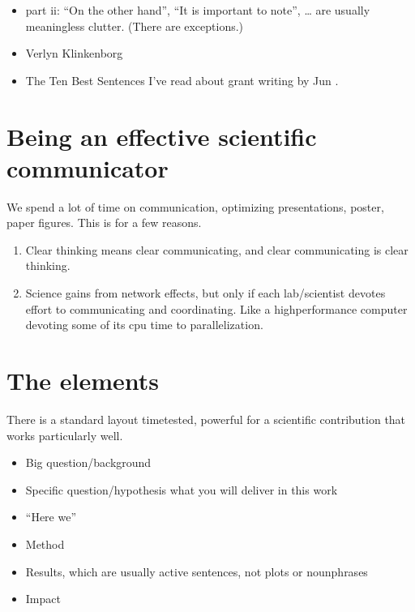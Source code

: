 \documentclass[letterpaper,10pt,english]{sphinxmanual}
\begin{document}
\begin{itemize}
\item {} 
\sphinxAtStartPar
{} part ii: “On the other hand”, “It is important to note”, … are usually meaningless clutter. (There are exceptions.)

\item {} 
\sphinxAtStartPar
Verlyn Klinkenborg 

\item {} 
\sphinxAtStartPar
The Ten Best Sentences I’ve read about grant writing by Jun .

\end{itemize}


\section{Being an effective scientific communicator}
\label{\detokenize{02Elements:being-an-effective-scientific-communicator}}
\sphinxAtStartPar
We spend a lot of time on communication, optimizing presentations, poster, paper figures. This is for a few reasons.
\begin{enumerate}
%
\item {} 
\sphinxAtStartPar
Clear thinking means clear communicating, and clear communicating is clear thinking.

\item {} 
\sphinxAtStartPar
Science gains from network effects, but only if each lab/scientist devotes effort to communicating and coordinating. Like a high\sphinxhyphen{}performance computer devoting some of its cpu time to parallelization.

\end{enumerate}


\section{The elements}
\label{\detokenize{02Elements:the-elements}}
\sphinxAtStartPar
There is a standard layout \textendash{} time\sphinxhyphen{}tested, powerful \textendash{} for a  scientific contribution that works particularly well.
\begin{itemize}
\item {} 
\sphinxAtStartPar
Big question/background

\item {} 
\sphinxAtStartPar
Specific question/hypothesis \textendash{} what you will deliver in this work

\item {} 
\sphinxAtStartPar
“Here we”

\item {} 
\sphinxAtStartPar
Method

\item {} 
\sphinxAtStartPar
Results, which are usually active sentences, not plots or noun\sphinxhyphen{}phrases

\item {} 
\sphinxAtStartPar
Impact

\end{itemize}
\end{document}
